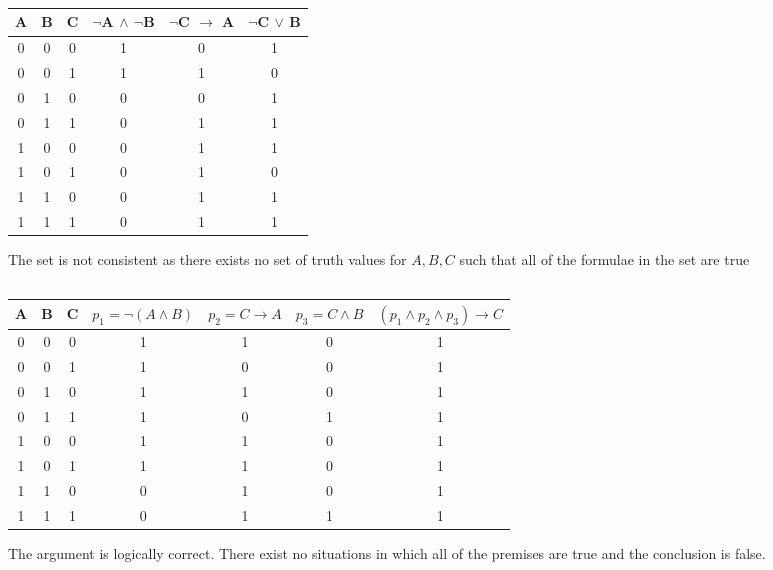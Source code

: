 \documentclass[10pt]{article} %
\begin{document}
\subsubsection{}
\begin{tabular}{c|c|c||c|c|c}
A & B & C & $\neg$A $\wedge$  $\neg$B &  $\neg$C $\to$ A & $\neg$C $\vee$ B \\
\hline
0 & 0 & 0 & 1 & 0 & 1 \\
0 & 0 & 1 & 1 & 1 & 0 \\
0 & 1 & 0 & 0 & 0 & 1 \\
0 & 1 & 1 & 0 & 1 & 1 \\
1 & 0 & 0 & 0 & 1 & 1 \\
1 & 0 & 1 & 0 & 1 & 0 \\
1 & 1 & 0 & 0 & 1 & 1 \\
1 & 1 & 1 & 0 & 1 & 1 \\
\end{tabular}
 
\vspace{20px}
The set is not consistent as there exists no set of truth values for ${A, B, C}$ such that all of the formulae in the set are true

\subsection{}

\begin{tabular}{c|c|c||c|c|c|c}
A & B & C & $p_1=\neg(A\wedge B)$ & $p_2 = C \to A$ &  $p_3 = C \wedge B$ & $(p_1 \wedge p_2 \wedge p_3) \to C$\\
\hline
0 & 0 & 0 & 1 & 1 & 0 & 1 \\
0 & 0 & 1 & 1 & 0 & 0 & 1 \\
0 & 1 & 0 & 1 & 1 & 0 & 1 \\
0 & 1 & 1 & 1 & 0 & 1 & 1 \\
1 & 0 & 0 & 1 & 1 & 0 & 1 \\
1 & 0 & 1 & 1 & 1 & 0 & 1 \\
1 & 1 & 0 & 0 & 1 & 0 & 1 \\
1 & 1 & 1 & 0 & 1 & 1 & 1 \\
\end{tabular}

\vspace{20px}
The argument is logically correct. There exist no situations in which all of the premises are true and the conclusion is false.
\section{}
\end{document}
